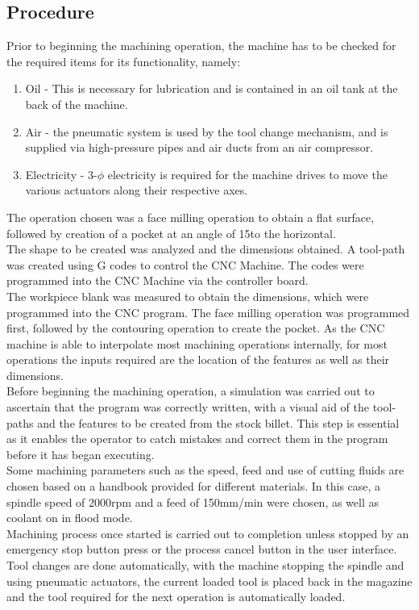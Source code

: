 \subsection{Procedure}
Prior to beginning the machining operation, the machine has to be checked for the required items for its functionality, namely:
\begin{enumerate}
	\item Oil - This is necessary for lubrication and is contained in an oil tank at the back of the machine.
	\item Air - the pneumatic system is used by the tool change mechanism, and is supplied via high-pressure pipes and air ducts from an air compressor.
	\item Electricity - 3-$\phi$ electricity is required for the machine drives to move the various actuators along their respective axes.
\end{enumerate}
The operation chosen was a face milling operation to obtain a flat surface, followed by creation of a pocket at an angle of 15\textdegree \space to the horizontal.\\
The shape to be created was analyzed and the dimensions obtained. A tool-path was created using G codes to control the CNC Machine. The codes were programmed into the CNC Machine via the controller board.\\
The workpiece blank was measured to obtain the dimensions, which were programmed into the CNC program. The face milling operation was programmed first, followed by the contouring operation to create the pocket. As the CNC machine is able to interpolate most machining operations internally, for most operations the inputs required are the location of the features as well as their dimensions.\\
Before beginning the machining operation, a simulation was carried out to ascertain that the program was correctly written, with a visual aid of the tool-paths and the features to be created from the stock billet. This step is essential as it enables the operator to catch mistakes and correct them in the program before it has began executing.\\
Some machining parameters such as the speed, feed and use of cutting fluids are chosen based on a handbook provided for different materials. In this case, a spindle speed of 2000rpm and a feed of 150mm/min were chosen, as well as coolant on in flood mode.\\
Machining process once started is carried out to completion unless stopped by an emergency stop button press or the process cancel button in the user interface. Tool changes are done automatically, with the machine stopping the spindle and using pneumatic actuators, the current loaded tool is placed back in the magazine and the tool required for the next operation is automatically loaded.\\
